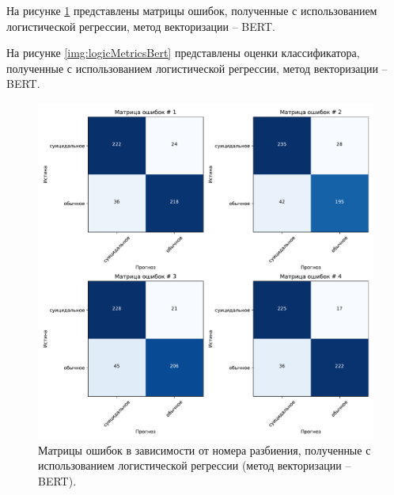 На рисунке \ref{img:logicMatrBert} представлены матрицы ошибок, полученные с использованием логистической регрессии, метод векторизации -- BERT.

На рисунке \ref{img:logicMetricsBert} представлены оценки классификатора, полученные с использованием логистической регрессии, метод векторизации -- BERT.

\begin{figure}[H]
	\centering
	\includegraphics[width=\textwidth]{inc/plots/logicMatrBert.pdf}
	\caption{ Матрицы ошибок в зависимости от номера разбиения, полученные с использованием логистической регрессии (метод векторизации -- BERT). }
	\label{img:logicMatrBert}
\end{figure}

